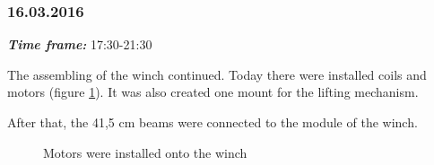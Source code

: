 \subsubsection{16.03.2016}
\textit{\textbf{Time frame:}} 17:30-21:30 

The assembling of the winch continued. Today there were installed coils and motors (figure \ref{Winch4.4}). It was also created one mount for the lifting mechanism.

After that, the 41,5 cm beams were connected to the module of the winch.


\begin{figure}[H]
	\begin{minipage}[h]{1\linewidth}
		\caption{Motors were installed onto the winch}
		\label{Winch4.4}
	\end{minipage}
\end{figure}
